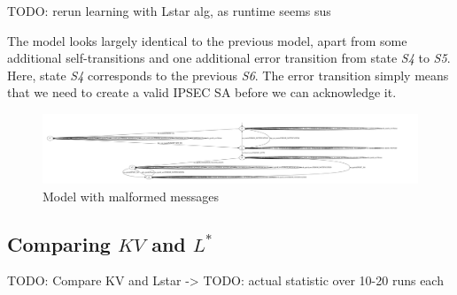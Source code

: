 TODO: rerun learning with Lstar alg, as runtime seems sus

The model looks largely identical to the previous model, apart from some additional self-transitions and one additional error transition from state \emph{S4} to \emph{S5}. Here, state \emph{S4} corresponds to the previous \emph{S6}. The error transition simply means that we need to create a valid IPSEC SA before we can acknowledge it.

\begin{figure}
	\centering
	\includegraphics[width=\linewidth]{images/WithFilterWithErrors}
	\caption{Model with malformed messages}
	\label{fig:withfilterwitherrors}
\end{figure}

\subsection{Comparing $KV$ and $L^*$} \label{subsec:comp_kv_lstar}
TODO: Compare KV and Lstar -> TODO: actual statistic over 10-20 runs each


